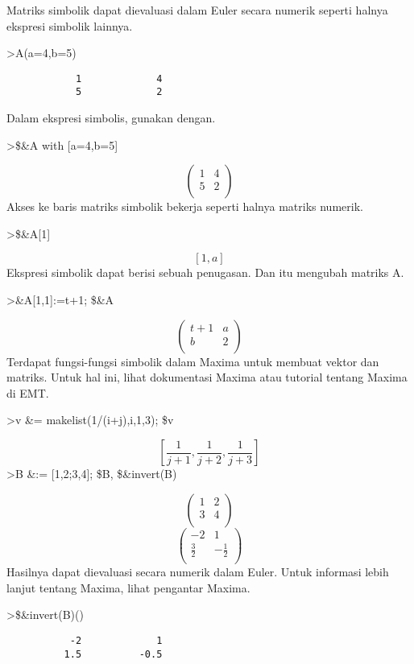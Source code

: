 \documentclass[
]{book}
\begin{document}
Matriks simbolik dapat dievaluasi dalam Euler secara numerik seperti halnya ekspresi simbolik lainnya.

\textgreater A(a=4,b=5)

\begin{verbatim}
            1             4 
            5             2 
\end{verbatim}

Dalam ekspresi simbolis, gunakan dengan.

\textgreater\$\&A with {[}a=4,b=5{]}

\[\begin{pmatrix}1 & 4 \\ 5 & 2 \\ \end{pmatrix}\]Akses ke baris matriks simbolik bekerja seperti halnya matriks numerik.

\textgreater\$\&A{[}1{]}

\[\left[ 1 , a \right] \]Ekspresi simbolik dapat berisi sebuah penugasan. Dan itu mengubah matriks A.

\textgreater\&A{[}1,1{]}:=t+1; \$\&A

\[\begin{pmatrix}t+1 & a \\ b & 2 \\ \end{pmatrix}\]Terdapat fungsi-fungsi simbolik dalam Maxima untuk membuat vektor dan matriks. Untuk hal ini, lihat dokumentasi Maxima atau tutorial tentang Maxima di EMT.

\textgreater v \&= makelist(1/(i+j),i,1,3); \$v

\[\left[ \frac{1}{j+1} , \frac{1}{j+2} , \frac{1}{j+3} \right] \]\textgreater B \&:= {[}1,2;3,4{]}; \$B, \$\&invert(B)

\[\begin{pmatrix}1 & 2 \\ 3 & 4 \\ \end{pmatrix}\]\[\begin{pmatrix}-2 & 1 \\ \frac{3}{2} & -\frac{1}{2} \\ 
 \end{pmatrix}\]Hasilnya dapat dievaluasi secara numerik dalam Euler. Untuk informasi lebih lanjut tentang Maxima, lihat pengantar Maxima.

\textgreater\$\&invert(B)()

\begin{verbatim}
           -2             1 
          1.5          -0.5 
\end{verbatim}
\end{document}
